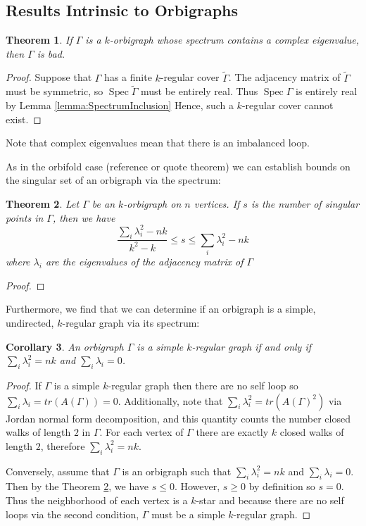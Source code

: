 \documentclass[12pt]{article}
\theoremstyle{plain}
\newtheorem{theorem}{Theorem}
\newtheorem{corollary}[theorem]{Corollary}
\theoremstyle{definition}
\theoremstyle{remark}
\DeclareMathOperator*{\spec}{Spec}
\begin{document}
  \subsection{Results Intrinsic to Orbigraphs}

    \begin{theorem}\label{thm:ComplexEigenvalues}
      If $\Gamma$ is a $k$-orbigraph whose spectrum contains a complex eigenvalue, then $\Gamma$ is bad.
    \end{theorem}
    \begin{proof}
      Suppose that $\Gamma$ has a finite $k$-regular cover $\widetilde{\Gamma}$. The adjacency matrix of $\widetilde{\Gamma}$ must be symmetric, so $\spec{\widetilde{\Gamma}}$ must be entirely real. Thus $\spec{\Gamma}$ is entirely real by Lemma \ref{lemma:SpectrumInclusion} Hence, such a $k$-regular cover cannot exist.
    \end{proof}

    Note that complex eigenvalues mean that there is an imbalanced loop.

    As in the orbifold case (reference or quote theorem) we can establish bounds on the singular set of an orbigraph via the spectrum:

    \begin{theorem}\label{thm:SingularBounds}
      Let $\Gamma$ be an $k$-orbigraph on $n$ vertices. If $s$ is the number of singular points in $\Gamma$, then we have
      $$
        \frac{\sum_{i} \lambda_i^2 - n k}{k^2 - k} \le s \le \sum_{i} \lambda_i^2 - n k
      $$
      where $\lambda_i$ are the eigenvalues of the adjacency matrix of $\Gamma$
    \end{theorem}
    \begin{proof}
      
    \end{proof}

    Furthermore, we find that we can determine if an orbigraph is a simple, undirected, $k$-regular graph via its spectrum:
    \begin{corollary}
      An orbigraph $\Gamma$ is a simple $k$-regular graph if and only if $\sum_{i} \lambda_i^2 = n k$ and $\sum_{i} \lambda_i = 0$.
    \end{corollary}
    \begin{proof}
      If $\Gamma$ is a simple $k$-regular graph then there are no self loop so $\sum_{i} \lambda_i = tr(A(\Gamma)) = 0$. Additionally, note that $\sum_{i} \lambda_i^2 = tr(A(\Gamma)^2)$ via Jordan normal form decomposition, and this quantity counts the number closed walks of length $2$ in $\Gamma$. For each vertex of $\Gamma$ there are exactly $k$ closed walks of length $2$, therefore $\sum_{i} \lambda_i^2 = n k$. 

      Conversely, assume that $\Gamma$ is an orbigraph such that $\sum_{i} \lambda_i^2 = n k$ and $\sum_{i} \lambda_i = 0$. Then by the Theorem \ref{thm:SingularBounds}, we have $s \le 0$. However, $s \ge 0$ by definition so $s = 0$. Thus the neighborhood of each vertex is a $k$-star and because there are no self loops via the second condition, $\Gamma$ must be a simple $k$-regular graph.
    \end{proof}
\end{document}
